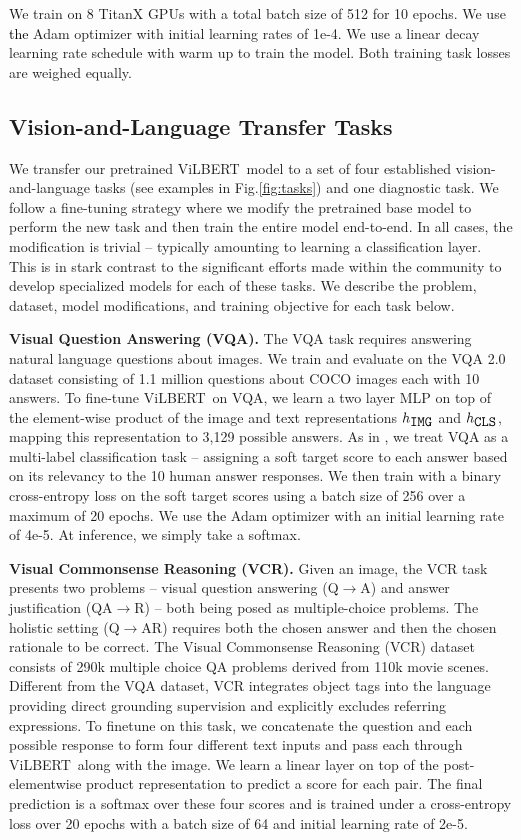 We train on 8 TitanX GPUs with a total batch size of 512 for 10 epochs. We use \textcolor{Black}{the} Adam optimizer with initial learning rates of 1e-4. We use a linear decay learning rate schedule with warm up to train the model. Both training task losses are weighed equally.

\subsection{Vision-and-Language Transfer Tasks}
\label{sec:tasks}

We transfer our pretrained ViLBERT~model to a set of four established vision-and-language tasks (see examples in Fig.\ref{fig:tasks}) and one diagnostic task. We follow a fine-tuning strategy where we modify the pretrained base model to perform the new task and then train the entire model end-to-end. In all cases, the modification is trivial -- typically amounting to learning a classification layer. This is in stark contrast to the significant efforts made within the community to develop specialized models for each of these tasks. We describe the problem, dataset, model modifications, and training objective for each task below.

\textbf{Visual Question Answering (VQA).} The VQA task requires answering natural language questions about images. We train and evaluate on the VQA 2.0 dataset \cite{vqa} consisting of 1.1 million questions about COCO images \cite{cococaption} each with 10 answers. To fine-tune ViLBERT~on VQA, we learn a two layer MLP on top of the element-wise product of the image and text representations $h_{\mbox{\texttt{IMG}}}$ and $h_{\mbox{\texttt{CLS}}}$, mapping this representation to 3,129 possible answers. As in \cite{anderson2018bottom}, we treat VQA as a multi-label classification task -- assigning a soft target score to each answer based on its relevancy to the 10 human answer responses. We then train with a binary cross-entropy loss on the soft target scores using a batch size of 256 over a maximum of 20 epochs. We use \textcolor{Black}{the} Adam optimizer with an initial learning rate of 4e-5. At inference, we simply take a softmax. 

\textbf{Visual Commonsense Reasoning (VCR).} Given an image, the VCR task presents two problems -- visual question answering (Q$\rightarrow$A) and answer justification (QA$\rightarrow$R) -- both being posed as multiple-choice problems. The holistic setting (Q$\rightarrow$AR) requires both the chosen answer and then the chosen rationale to be correct. The Visual Commonsense Reasoning (VCR) dataset consists of 290k multiple choice QA problems derived from 110k movie scenes. Different from the VQA dataset, VCR integrates object tags into the language providing direct grounding supervision and explicitly excludes referring expressions. To finetune on this task, we concatenate the question and each possible response to form four different text inputs and pass each through ViLBERT~along with the image. We learn a linear layer on top of the post-elementwise product representation to predict a score for each pair. The final prediction is a softmax over these four scores and is trained under a cross-entropy loss over 20 epochs with a batch size of 64 and initial learning rate of 2e-5. 

